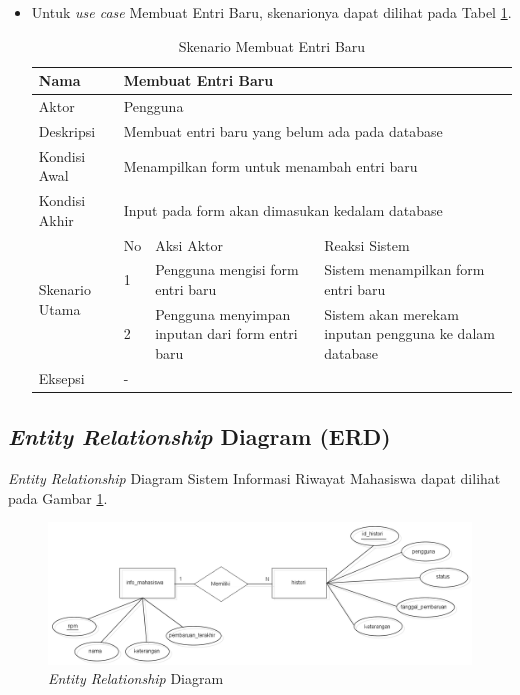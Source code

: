 \begin{itemize}
\item Untuk {\it use case} Membuat Entri Baru, skenarionya dapat dilihat pada Tabel
\ref{tab:skenarioentribaru}.

\begin{table}[ht]
\centering
\caption[Tabel Skenario Membuat Entri Baru]{Skenario Membuat Entri Baru}
\label{tab:skenarioentribaru}
\begin{tabular}{|p{1.4cm}|p{0.4cm}|p{2cm}|p{2cm}|p{2cm}|p{2cm}|}
\hline
Nama & \multicolumn{5}{p{8cm}|}{Membuat Entri Baru} \\ \hline
Aktor & \multicolumn{5}{p{8cm}|}{Pengguna} \\ \hline
Deskripsi & \multicolumn{5}{p{8cm}|}{Membuat entri baru yang belum ada pada
database} \\ \hline
Kondisi Awal & \multicolumn{5}{p{8cm}|}{Menampilkan form untuk menambah entri
baru} \\ \hline
Kondisi Akhir & \multicolumn{5}{p{8cm}|}{Input pada form akan dimasukan kedalam
database} \\ \hline
\multirow{3}{*}{\parbox{1.4cm}{Skenario Utama}} & No &
\multicolumn{2}{p{4cm}|}{Aksi Aktor} & \multicolumn{2}{p{4cm}|}{Reaksi Sistem}
\\ \cline{2-6}
& 1 & \multicolumn{2}{p{4cm}|}{Pengguna mengisi form entri baru} &
\multicolumn{2}{p{4cm}|}{Sistem menampilkan form entri baru} \\ \cline{2-6}
& 2 & \multicolumn{2}{p{4cm}|}{Pengguna menyimpan inputan dari form entri baru}
& \multicolumn{2}{p{4cm}|}{Sistem akan merekam inputan pengguna ke dalam
database} \\ \hline
Eksepsi & \multicolumn{5}{p{8cm}|}{-} \\ \hline
\end{tabular}
\end{table}
\end{itemize}

\subsection{{\it Entity Relationship} Diagram (ERD)}
{\it Entity Relationship} Diagram Sistem Informasi Riwayat Mahasiswa dapat
dilihat pada Gambar \ref{fig:erd}.

\begin{figure}[ht]
\centering
\includegraphics[scale=0.4]{Gambar/ERD.png}
\caption[{\it Entity Relationship} Diagram]{{\it Entity Relationship} Diagram} 
\label{fig:erd}
\end{figure}

